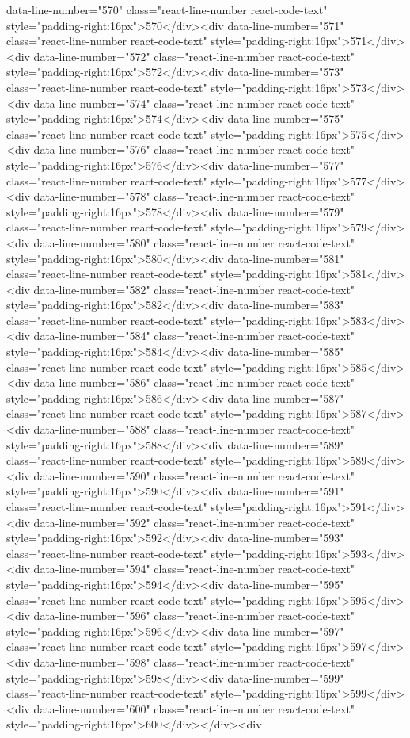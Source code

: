 {{{{{{{data-line-number="570" class="react-line-number react-code-text" style="padding-right:16px">570</div><div data-line-number="571" class="react-line-number react-code-text" style="padding-right:16px">571</div><div data-line-number="572" class="react-line-number react-code-text" style="padding-right:16px">572</div><div data-line-number="573" class="react-line-number react-code-text" style="padding-right:16px">573</div><div data-line-number="574" class="react-line-number react-code-text" style="padding-right:16px">574</div><div data-line-number="575" class="react-line-number react-code-text" style="padding-right:16px">575</div><div data-line-number="576" class="react-line-number react-code-text" style="padding-right:16px">576</div><div data-line-number="577" class="react-line-number react-code-text" style="padding-right:16px">577</div><div data-line-number="578" class="react-line-number react-code-text" style="padding-right:16px">578</div><div data-line-number="579" class="react-line-number react-code-text" style="padding-right:16px">579</div><div data-line-number="580" class="react-line-number react-code-text" style="padding-right:16px">580</div><div data-line-number="581" class="react-line-number react-code-text" style="padding-right:16px">581</div><div data-line-number="582" class="react-line-number react-code-text" style="padding-right:16px">582</div><div data-line-number="583" class="react-line-number react-code-text" style="padding-right:16px">583</div><div data-line-number="584" class="react-line-number react-code-text" style="padding-right:16px">584</div><div data-line-number="585" class="react-line-number react-code-text" style="padding-right:16px">585</div><div data-line-number="586" class="react-line-number react-code-text" style="padding-right:16px">586</div><div data-line-number="587" class="react-line-number react-code-text" style="padding-right:16px">587</div><div data-line-number="588" class="react-line-number react-code-text" style="padding-right:16px">588</div><div data-line-number="589" class="react-line-number react-code-text" style="padding-right:16px">589</div><div data-line-number="590" class="react-line-number react-code-text" style="padding-right:16px">590</div><div data-line-number="591" class="react-line-number react-code-text" style="padding-right:16px">591</div><div data-line-number="592" class="react-line-number react-code-text" style="padding-right:16px">592</div><div data-line-number="593" class="react-line-number react-code-text" style="padding-right:16px">593</div><div data-line-number="594" class="react-line-number react-code-text" style="padding-right:16px">594</div><div data-line-number="595" class="react-line-number react-code-text" style="padding-right:16px">595</div><div data-line-number="596" class="react-line-number react-code-text" style="padding-right:16px">596</div><div data-line-number="597" class="react-line-number react-code-text" style="padding-right:16px">597</div><div data-line-number="598" class="react-line-number react-code-text" style="padding-right:16px">598</div><div data-line-number="599" class="react-line-number react-code-text" style="padding-right:16px">599</div><div data-line-number="600" class="react-line-number react-code-text" style="padding-right:16px">600</div></div><div }}}}}}}
